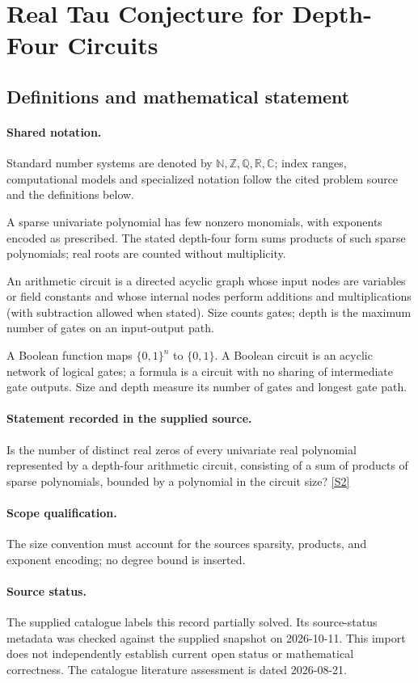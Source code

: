\documentclass[11pt]{article}
\newcommand{\sref}[2]{\hyperlink{source:#1:#2}{[S#2]}}
\begin{document}
\section{Real Tau Conjecture for Depth-Four Circuits}\label{statement}

\subsection{Definitions and mathematical statement}

\paragraph{Shared notation.}Standard number systems are denoted by $\mathbb N,\mathbb Z,\mathbb Q,\mathbb R,\mathbb C$; index ranges, computational models and specialized notation follow the cited problem source and the definitions below.


A sparse univariate polynomial has few nonzero monomials, with exponents encoded as prescribed. The stated depth-four form sums products of such sparse polynomials; real roots are counted without multiplicity.

An arithmetic circuit is a directed acyclic graph whose input nodes are variables or field constants and whose internal nodes perform additions and multiplications (with subtraction allowed when stated). Size counts gates; depth is the maximum number of gates on an input-output path.

A Boolean function maps $\{0,1\}^n$ to $\{0,1\}$. A Boolean circuit is an acyclic network of logical gates; a formula is a circuit with no sharing of intermediate gate outputs. Size and depth measure its number of gates and longest gate path.
\paragraph{Statement recorded in the supplied source.}
Is the number of distinct real zeros of every univariate real polynomial represented by a depth-four arithmetic circuit, consisting of a sum of products of sparse polynomials, bounded by a polynomial in the circuit size? \sref{statement}{2}
\paragraph{Scope qualification.}
The size convention must account for the source\textquotesingle s sparsity, products, and exponent encoding; no degree bound is inserted.
\paragraph{Source status.}
The supplied catalogue labels this record partially solved. Its source-status metadata was checked against the supplied snapshot on 2026-10-11. This import does not independently establish current open status or mathematical correctness. The catalogue literature assessment is dated 2026-08-21.
\end{document}
